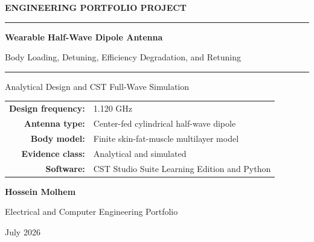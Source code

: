 \begin{titlepage}
\centering
\vspace*{1.4cm}
{\Large\bfseries ENGINEERING PORTFOLIO PROJECT\par}
\vspace{1.2cm}
\rule{\textwidth}{0.8pt}
\vspace{0.55cm}
{\Huge\bfseries Wearable Half-Wave Dipole Antenna\par}
\vspace{0.35cm}
{\Large Body Loading, Detuning, Efficiency Degradation, and Retuning\par}
\vspace{0.55cm}
\rule{\textwidth}{0.8pt}
\vspace{1.5cm}
{\large Analytical Design and CST Full-Wave Simulation\par}
\vspace{1.2cm}
\begin{tabular}{rl}
\textbf{Design frequency:} & 1.120 GHz\\
\textbf{Antenna type:} & Center-fed cylindrical half-wave dipole\\
\textbf{Body model:} & Finite skin-fat-muscle multilayer model\\
\textbf{Evidence class:} & Analytical and simulated\\
\textbf{Software:} & CST Studio Suite Learning Edition and Python
\end{tabular}
\vfill
{\Large\bfseries Hossein Molhem\par}
\vspace{0.25cm}
{\large Electrical and Computer Engineering Portfolio\par}
\vspace{0.8cm}
{\large July 2026\par}
\end{titlepage}
